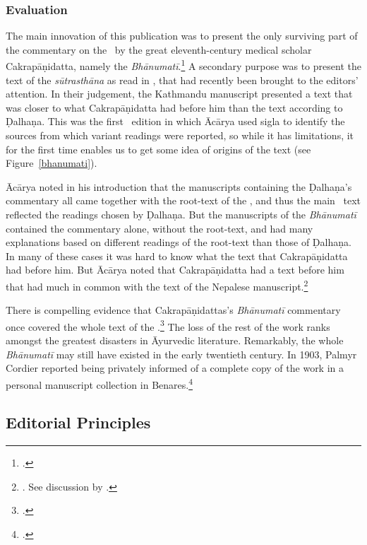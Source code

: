 \subsubsection{Evaluation}

The main innovation of this publication was to present the only surviving part of
the commentary on the \SS\ by the great eleventh-century medical scholar
Cakrapāṇidatta, namely the \emph{Bhānumatī}.\footcite[IA, 374--375 and IB,
495--496]{meul-hist} A secondary purpose was to present the text of the
\emph{sūtrasthāna} as read in , that had recently 
been
brought to the editors' attention. In their judgement, the Kathmandu manuscript
presented a text that was closer to what Cakrapāṇidatta had before him than the
text according to Ḍalhaṇa.   This was the first \SS\ edition in which Ācārya used
sigla to identify the sources from which variant readings were reported, so while
it has limitations, it for the first time enables us to get some idea of origins
of the text (see Figure~\ref{bhanumati}).

Ācārya noted in his introduction that the manuscripts containing the Ḍalhaṇa's
commentary all came together with the root-text of the \SS, and thus the main \SS\
text reflected the readings chosen by Ḍalhaṇa.  But the manuscripts of the
\emph{Bhānumatī} contained the commentary alone, without the root-text, and 
had
many explanations based on different readings of the root-text than those of
Ḍalhaṇa.  In many of these cases it was hard to know what the text that
Cakrapāṇidatta had before him. But Ācārya noted that Cakrapāṇidatta had a text
before him that had much in common with the text of the Nepalese
manuscript.\footnote{\cite[3--4]{acar-1939}.  See discussion by
\citet[7]{kleb-2021a}.}  

There is compelling evidence that Cakrapāṇidattas's \emph{Bhānumatī} 
commentary
once covered the whole text of the \SS.\footcite[IA, 375]{meul-hist}  The loss of
the rest of the work ranks amongst the greatest disasters in Āyurvedic
literature.  Remarkably, the whole \emph{Bhānumatī} may still have existed in the
early twentieth century. In 1903, Palmyr Cordier reported being privately informed
of a complete copy of the work in a personal manuscript collection in
Benares.\footcite[332]{cord-1903}
   
\subsection{Editorial Principles}

